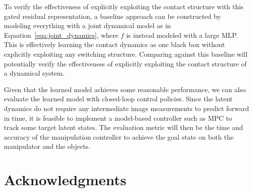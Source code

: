 \documentclass[conference]{IEEEtran}
\begin{document}
To verify the effectiveness of explicitly exploiting the contact structure with
this gated residual representation, a baseline approach can be constructed by
modeling everything with a joint dynamical model as in Equation~\ref{eqa:joint_dynamics},
where $f$ is instead modeled with a large MLP. This is effectively learning
the contact dynamics as one black box without explicitly exploiting any
switching structure. Comparing against this baseline will potentially verify
the effectiveness of explicitly exploiting the contact structure of a
dynamical system.

Given that the learned model achieves some reasonable performance, we can also
evaluate the learned model with closed-loop control policies. Since the latent
dynamics do not require any intermediate image measurements to predict forward
in time, it is feasible to implement a model-based controller such as MPC to track
some target latent states. The evaluation metric will then be the time and accuracy
of the manipulation controller to achieve the goal state on both the manipulator
and the objects.

\section*{Acknowledgments}



\end{document}
